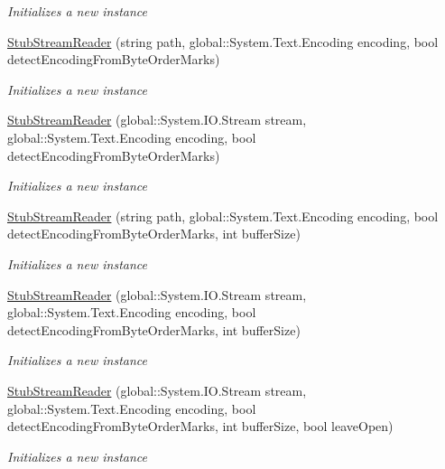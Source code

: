 \begin{DoxyCompactItemize}
\begin{DoxyCompactList}\small\item\em Initializes a new instance\end{DoxyCompactList}\item 
\hyperlink{class_system_1_1_i_o_1_1_fakes_1_1_stub_stream_reader_a06e471fad7d76004a4cccef29bd8d989}{Stub\-Stream\-Reader} (string path, global\-::\-System.\-Text.\-Encoding encoding, bool detect\-Encoding\-From\-Byte\-Order\-Marks)
\begin{DoxyCompactList}\small\item\em Initializes a new instance\end{DoxyCompactList}\item 
\hyperlink{class_system_1_1_i_o_1_1_fakes_1_1_stub_stream_reader_a41f7cebab07c0980f56bed4f1fb8e7ee}{Stub\-Stream\-Reader} (global\-::\-System.\-I\-O.\-Stream stream, global\-::\-System.\-Text.\-Encoding encoding, bool detect\-Encoding\-From\-Byte\-Order\-Marks)
\begin{DoxyCompactList}\small\item\em Initializes a new instance\end{DoxyCompactList}\item 
\hyperlink{class_system_1_1_i_o_1_1_fakes_1_1_stub_stream_reader_a80595f1a585ed9afd33f63faffa5d970}{Stub\-Stream\-Reader} (string path, global\-::\-System.\-Text.\-Encoding encoding, bool detect\-Encoding\-From\-Byte\-Order\-Marks, int buffer\-Size)
\begin{DoxyCompactList}\small\item\em Initializes a new instance\end{DoxyCompactList}\item 
\hyperlink{class_system_1_1_i_o_1_1_fakes_1_1_stub_stream_reader_a210f08cf59bbfbbc36ca43b7f8c4f0e4}{Stub\-Stream\-Reader} (global\-::\-System.\-I\-O.\-Stream stream, global\-::\-System.\-Text.\-Encoding encoding, bool detect\-Encoding\-From\-Byte\-Order\-Marks, int buffer\-Size)
\begin{DoxyCompactList}\small\item\em Initializes a new instance\end{DoxyCompactList}\item 
\hyperlink{class_system_1_1_i_o_1_1_fakes_1_1_stub_stream_reader_a43b519c8c226ee18de4f7fab9beb5290}{Stub\-Stream\-Reader} (global\-::\-System.\-I\-O.\-Stream stream, global\-::\-System.\-Text.\-Encoding encoding, bool detect\-Encoding\-From\-Byte\-Order\-Marks, int buffer\-Size, bool leave\-Open)
\begin{DoxyCompactList}\small\item\em Initializes a new instance\end{DoxyCompactList}\item 

\end{DoxyCompactItemize}
